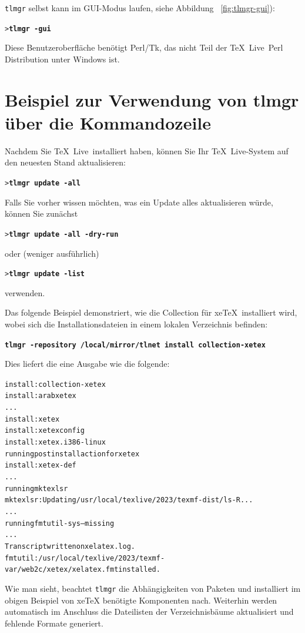 \documentclass[12pt,ngerman,a4paper,fullparskip]{scrreprt}
\newcommand{\TL}{\TeX\ Live\xspace}
\newcommand{\prog}[1]{\texttt{#1}}
\newcommand{\Ucom}[1]{\textbf{\texttt{#1}}}
\providecommand*{\XeTeX}{xe\TeX\xspace}
\begin{document}
\prog{tlmgr} selbst kann im GUI-Modus laufen, siehe Abbildung
~\ref{fig:tlmgr-gui}):

\begin{alltt}
> \Ucom{tlmgr -gui}
\end{alltt}

Diese Benutzeroberfläche benötigt Perl/Tk, das nicht Teil der \TL\ Perl Distribution unter Windows ist.

\section{Beispiel zur Verwendung von tlmgr über die Kommandozeile}


Nachdem Sie \TL\ installiert haben, können Sie Ihr \TL-System auf den
neuesten Stand aktualisieren:
\begin{alltt}
> \Ucom{tlmgr update -all}
\end{alltt}
Falls Sie vorher wissen möchten, was ein Update alles aktualisieren würde, können Sie zunächst
\begin{alltt}
> \Ucom{tlmgr update -all -dry-run}
\end{alltt}
oder (weniger ausführlich)
\begin{alltt}
> \Ucom{tlmgr update -list}
\end{alltt}
verwenden.

Das folgende Beispiel demonstriert, wie die Collection für \XeTeX\ installiert
wird, wobei sich die Installationsdateien in einem lokalen Verzeichnis
befinden:
 
\begin{alltt}
\Ucom{tlmgr -repository /local/mirror/tlnet install collection-xetex}
\end{alltt}
Dies liefert die eine  Ausgabe wie die folgende:

\begin{alltt}\small
install: collection-xetex
install: arabxetex
...
install: xetex
install: xetexconfig
install: xetex.i386-linux
running post install action for xetex
install: xetex-def
...
running mktexlsr
mktexlsr: Updating /usr/local/texlive/2023/texmf-dist/ls-R...
...
running fmtutil-sys --missing
...
Transcript written on xelatex.log.
fmtutil: /usr/local/texlive/2023/texmf-var/web2c/xetex/xelatex.fmt installed.
\end{alltt}

Wie man sieht, beachtet \prog{tlmgr} die Abhängigkeiten von Paketen und installiert im obigen Beispiel von \XeTeX{} benötigte Komponenten nach. Weiterhin werden automatisch im Anschluss die Dateilisten der Verzeichnisbäume aktualisiert und fehlende Formate generiert.
\end{document}
